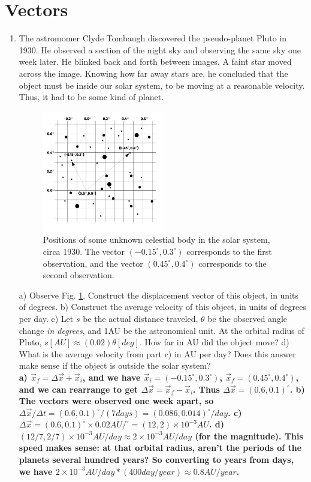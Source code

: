 \documentclass[10pt]{article}
\begin{document}
\section{Vectors}
\begin{enumerate}
\item The astromomer Clyde Tombaugh discovered the pseudo-planet Pluto in 1930.  He observed a section of the night sky and observing the same sky one week later.  He blinked back and forth between images.  A faint star moved across the image.  Knowing how far away stars are, he concluded that the object must be inside our solar system, to be moving at a reasonable velocity.  Thus, it had to be some kind of planet.
\begin{figure}
\centering
\includegraphics[width=0.5\textwidth]{PlutoDrawing.pdf}
\caption{\label{fig:1} Positions of some unknown celestial body in the solar system, circa 1930.  The vector $(-0.15^{\circ},0.3^{\circ})$ corresponds to the first observation, and the vector $(0.45^{\circ},0.4^{\circ})$ corresponds to the second observation.}
\end{figure}
a) Observe Fig. \ref{fig:1}.  Construct the displacement vector of this object, in units of degrees.  b) Construct the average velocity of this object, in units of degrees per day.  c) Let $s$ be the actual distance traveled, $\theta$ be the observed angle change \textit{in degrees}, and 1AU be the astronomical unit.  At the orbital radius of Pluto, $s[AU] \approx (0.02) \theta[deg]$.  How far in AU did the object move?  d) What is the average velocity from part c) in AU per day?  Does this answer make sense if the object is outside the solar system?
\vspace{0.5 cm} \\
\textbf{a) $\vec{x}_f = \Delta \vec{x} + \vec{x}_i$, and we have $\vec{x}_i = (-0.15^{\circ},0.3^{\circ})$, $\vec{x}_f = (0.45^{\circ},0.4^{\circ})$, and we can rearrange to get $\Delta \vec{x} = \vec{x}_f - \vec{x}_i$.  Thus $\Delta\vec{x} = (0.6,0.1)^{\circ}$. b) The vectors were observed one week apart, so $\Delta\vec{x}/\Delta t = (0.6,0.1)^{\circ}/(7 days) = (0.086,0.014)^{\circ}/day$.  c) $\Delta \vec{x} = (0.6,0.1)^{\circ} \times 0.02 AU/^{\circ} = (12,2) \times 10^{-3} AU$.  d) $(12/7,2/7) \times 10^{-3} AU/day \approx 2 \times 10^{-3} AU/day$ (for the magnitude).  This speed makes sense: at that orbital radius, aren't the periods of the planets several hundred years?  So converting to years from days, we have $2 \times 10^{-3} AU/day * (400 day/year) \approx 0.8 AU/year$.}
\vspace{0.4 cm}
\end{enumerate}
\end{document}
